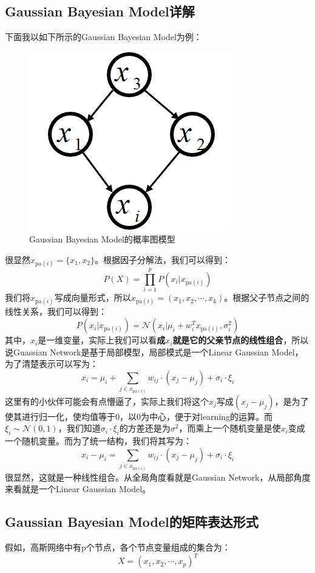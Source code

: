 \documentclass[a4paper]{article}
\begin{document}
\subsection{Gaussian Bayesian Model详解}
下面我以如下所示的Gaussian Bayesian Model为例：
\begin{figure}[H]
    \centering
    \includegraphics[width=.28\textwidth]{微信图片_20200226204441.png}
    \caption{Gaussian Bayesian Model的概率图模型}
    \label{fig:my_label_1}
\end{figure}
很显然$x_{\mathrm{pa}(i)}=\{x_1,x_2\}$。根据因子分解法，我们可以得到：
\begin{equation}
    P(X) = \prod_{i=1}^p P(x_i|x_{\mathrm{pa}(i)})
\end{equation}
我们将$x_{\mathrm{pa}(i)}$写成向量形式，所以$x_{\mathrm{pa}(i)} = (x_1,x_2,\cdots,x_k)$。根据父子节点之间的线性关系，我们可以得到：
\begin{equation}
    P(x_i|x_{\mathrm{pa}(i)}) = \mathcal{N}(x_i|\mu_i + w^T_ix_{\mathrm{pa}(i)}, \sigma_i^2 )
\end{equation}
其中，$x_i$是一维变量，实际上我们可以看\textbf{成$x_i$就是它的父亲节点的线性组合}，所以说Guassian Network是基于局部模型，局部模式是一个Linear Gaussian Model，为了清楚表示可以写为：
\begin{equation}
    x_i = \mu_i + \sum_{j \in x_{\mathrm{pa}(i)}} w_{ij}\cdot(x_j-\mu_j) + \sigma_i \cdot \xi_i
\end{equation}
这里有的小伙伴可能会有点懵逼了，实际上我们将这个$x_j$写成$(x_j-\mu_j)$，是为了使其进行归一化，使均值等于0，以0为中心，便于对learning的运算。而$\xi_i \sim \mathcal{N}(0,1)$，我们知道$\sigma_i \cdot \xi_i$的方差还是为$\sigma^2$，而乘上一个随机变量是使$x_i$变成一个随机变量。而为了统一结构，我们将其写为：
\begin{equation}
    x_i - \mu_i = \sum_{j \in x_{\mathrm{pa}(i)}} w_{ij}\cdot(x_j-\mu_j) + \sigma_i \cdot \xi_i
\end{equation}
很显然，这就是一种线性组合。从全局角度看就是Gaussian Network，从局部角度来看就是一个Linear Gaussian Model。

\subsection{Gaussian Bayesian Model的矩阵表达形式}
假如，高斯网络中有p个节点，各个节点变量组成的集合为：
$$
X=(x_1,x_2,\cdots,x_p)^T
$$
\end{document}
